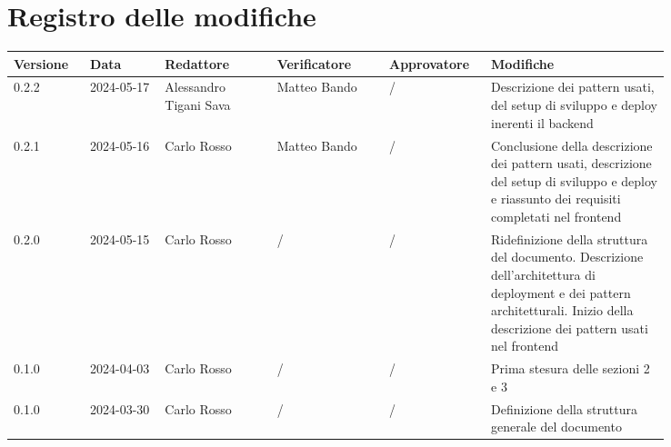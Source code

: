 \section*{Registro delle modifiche}
 {
  \renewcommand{\arraystretch}{1.5}
  \scriptsize
  \begin{longtable}{p{0.10\linewidth}p{0.10\linewidth}p{0.15\linewidth}p{0.15\linewidth}p{0.10\linewidth}p{0.24\linewidth}}
	  \textbf{Versione} & \textbf{Data} & \textbf{Redattore} 		& \textbf{Verificatore} & \textbf{Approvatore} 	& \textbf{Modifiche}                                 \\
	  \toprule
	  0.2.2             & 2024-05-17    & Alessandro Tigani Sava	& Matteo Bando 			& /						& Descrizione dei pattern usati,
	  del setup di sviluppo e deploy inerenti il backend \\
	  \hline 
	  0.2.1             & 2024-05-16    & Carlo Rosso				& Matteo Bando 			& /						& Conclusione della descrizione dei pattern usati,
	  descrizione del setup di sviluppo e deploy e riassunto dei requisiti completati nel frontend \\
	  \hline
	  0.2.0             & 2024-05-15    & Carlo Rosso                                      & /
	                    & /             & Ridefinizione della struttura del documento.
	  Descrizione dell'architettura di deployment e dei pattern architetturali.
	  Inizio della descrizione dei pattern usati nel frontend                                                                                                                                  \\
	  \hline
	  0.1.0             & 2024-04-03    & Carlo Rosso                                      & /                     & /                    & Prima stesura delle sezioni 2 e 3                  \\
	  \hline
	  0.1.0             & 2024-03-30    & Carlo Rosso                                      & /                     & /                    & Definizione della struttura generale del documento \\
	  \bottomrule
  \end{longtable}
 }
